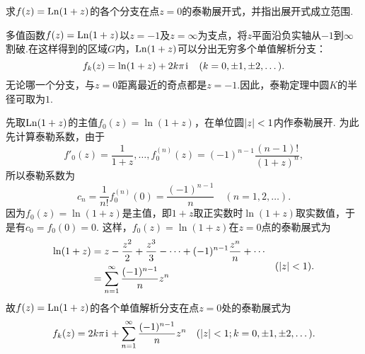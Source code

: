\begin{example}
求\(f(z) = \operatorname{Ln}(1+z)\)的各个分支在点\(z = 0\)的泰勒展开式，并指出展开式成立范围.
\begin{solution}
多值函数\(f(z) = \operatorname{Ln}(1+z)\)以\(z = -1\)及\(z = \infty\)为支点，将\(z\)平面沿负实轴从\(-1\)到\(\infty\)割破.在这样得到的区域\(G\)内，\(\operatorname{Ln}(1+z)\)可以分出无穷多个单值解析分支：\[
f_k(z) = \ln(1+z) + 2k\pi\kern1pt\mathrm{i}\kern1pt
\quad(k=0,\pm1,\pm2,\dotsc).
\]无论哪一个分支，与\(z = 0\)距离最近的奇点都是\(z = -1\).因此，泰勒定理中圆\(K\)的半径可取为\(1\).

先取\(\operatorname{Ln}(1+z)\)的主值\(f_0(z) = \ln(1+z)\)，在单位圆\(\abs{z}<1\)内作泰勒展开.
为此先计算泰勒系数，由于\[
f'_0(z) = \frac{1}{1+z},
\dotsc,
f^{(n)}_0(z) = (-1)^{n-1} \frac{(n-1)!}{(1+z)^n},
\]所以泰勒系数为\[
c_n = \frac{1}{n!} f^{(n)}_0(0) = \frac{(-1)^{n-1}}{n}
\quad (n=1,2,\dotsc).
\]因为\(f_0(z) = \ln(1+z)\)是主值，即\(1+z\)取正实数时\(\ln(1+z)\)取实数值，于是有\(c_0 = f_0(0) = 0\).
这样，\(f_0(z) = \ln(1+z)\)在\(z = 0\)点的泰勒展式为\begin{equation}\label{equation:解析函数的级数表示.对数函数的泰勒展式}
\begin{split}
\ln(1+z) &= z - \frac{z^2}{2} + \frac{z^3}{3} - \dotsb + (-1)^{n-1} \frac{z^n}{n} + \dotsb \\
&= \sum\limits_{n=1}^{\infty} \frac{(-1)^{n-1}}{n} z^n
\end{split}
\quad (\abs{z} < 1).
\end{equation}故\(f(z) = \operatorname{Ln}(1+z)\)的各个单值解析分支在点\(z = 0\)处的泰勒展式为\[
f_k(z) = 2k\pi\kern1pt\mathrm{i}\kern1pt + \sum\limits_{n=1}^{\infty} \frac{(-1)^{n-1}}{n} z^n
\quad (\abs{z} < 1; k=0,\pm1,\pm2,\dotsc).
\]
\end{solution}
\end{example}

